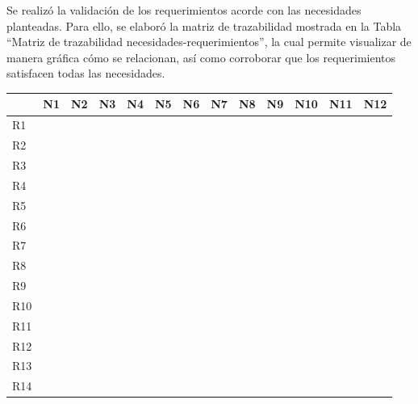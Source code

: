 
Se realizó la validación de los requerimientos acorde con las necesidades planteadas. Para ello, se elaboró la matriz de trazabilidad mostrada en la Tabla “Matriz de trazabilidad necesidades-requerimientos”, la cual permite visualizar de manera gráfica cómo se relacionan, así como corroborar que los requerimientos satisfacen todas las necesidades.
\begin{center}
\footnotesize
    \begin{longtable}[!htb]{| m{2em} || m{2em} | m{2em}| m{2em}| m{2em}| m{2em}| m{2em}| m{2em}| m{2em}| m{2em}| m{2em}| m{2em}| m{2em}|}
    \hline
    &N1 &N2 &N3 &N4 &N5 &N6 &N7 &N8 &N9 &N10 &N11 &N12\\
    \hline\hline
    R1 & \cellcolor{gr}{} &\cellcolor{gr}{} &\cellcolor{gr}{} &\cellcolor{gr}{} &\cellcolor{gr}{} &\cellcolor{gr}{} &\cellcolor{gr}{} & \cellcolor{gr}{}& \cellcolor{gr}{}& & &  \\
    \hline
    R2 & & & & & & & & & &\cellcolor{gr}{} & &  \\
    \hline
    R3 & & & & & & & & & &\cellcolor{gr}{} & & \\
    \hline
    R4 & \cellcolor{gr}{}& & & & & & & & & & & \\
    \hline
    R5 &\cellcolor{gr}{} & & & & & & & & & & & \\
    \hline
    R6 &\cellcolor{gr}{} & & & & & & & & & & & \\
    \hline
    R7 & \cellcolor{gr}{}& & & & & & & & & & & \\
    \hline
    R8 & \cellcolor{gr}{}& & & & & & & & & & & \\
    \hline
    R9 & \cellcolor{gr}{}& & & & & & & & & & & \\
    \hline
    R10 &\cellcolor{gr}{} & & & & & & & & & & & \\
    \hline
    R11 & &\cellcolor{gr}{} & \cellcolor{gr}{}& & \cellcolor{gr}{}& &\cellcolor{gr}{} & & & & & \\
    \hline
    R12 & & \cellcolor{gr}{}&\cellcolor{gr}{} & & \cellcolor{gr}{}& & \cellcolor{gr}{}& & & & & \\
    \hline
    R13 &\cellcolor{gr}{} & & \cellcolor{gr}{}& & \cellcolor{gr}{}& & \cellcolor{gr}{}& & & & & \\
    \hline
    R14 & \cellcolor{gr}{}&\cellcolor{gr}{} &\cellcolor{gr}{} & & & \cellcolor{gr}{}& &\cellcolor{gr}{} & & & & \\

\end{longtable}
\end{center}
